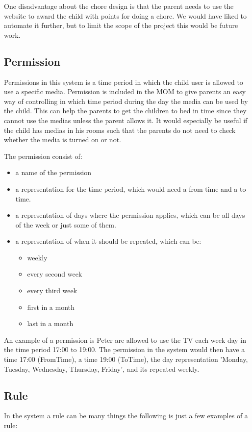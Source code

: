 One disadvantage about the chore design is that the parent needs to use the website to award the child with points for doing a chore. We would have liked to automate it further, but to limit the scope of the project this would be future work.  

\subsection{Permission}
Permissions in this system is a time period in which the child user is allowed to use a specific media. Permission is included in the MOM to give parents an easy way of controlling in which time period during the day the media can be used by the child. This can help the parents to get the children to bed in time since they cannot use the medias unless the parent allows it. It would especially be useful if the child has medias in his rooms such that the parents do not need to check whether the media is turned on or not. 

The permission consist of:
\begin{itemize}
	\item a name of the permission
	\item a representation for the time period, which would need a from time and a to time. 
	\item a representation of days where the permission applies, which can be all days of the week or just some of them.
	\item a representation of when it should be repeated, which can be:
		\begin{itemize}
		\item weekly
		\item every second week
		\item every third week
		\item first in a month
		\item last in a month
		\end{itemize}
\end{itemize}

An example of a permission is Peter are allowed to use the TV each week day in the time period 17:00 to 19:00. The permission in the system would then have a time 17:00 (FromTime), a time 19:00 (ToTime), the day representation 'Monday, Tuesday, Wednesday, Thursday, Friday', and its repeated weekly.


\subsection{Rule}
In the system a rule can be many things the following is just a few examples of a rule:

